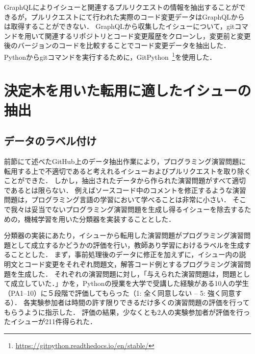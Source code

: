 GraphQLによりイシューと関連するプルリクエストの情報を抽出することができるが，プルリクエストにて行われた実際のコード変更データはGraphQLからは取得することができない．
GraphQLから収集したイシューについて，gitコマンドを用いて関連するリポジトリとコード変更履歴をクローンし，変更前と変更後のバージョンのコードを比較することでコード変更データを抽出した．
Pythonからgitコマンドを実行するために，GitPython~\footnote{\url{https://gitpython.readthedocs.io/en/stable/}}を使用した．

  
\section{決定木を用いた転用に適したイシューの抽出}

\subsection{データのラベル付け}
前節にて述べたGitHub上のデータ抽出作業により，プログラミング演習問題に転用する上で不適切であると考えれるイシューおよびプルリクエストを取り除くことができた．
しかし，抽出されたデータから作られた演習問題がすべて適切であるとは限らない．
例えばソースコード中のコメントを修正するような演習問題は，プログラミング言語の学習において学べることは非常に小さい．
そこで我々は妥当でないプログラミング演習問題を生成し得るイシューを除去するための，機械学習を用いた分類器を実装することとした．


分類器の実装にあたり，イシューから転用した演習問題がプログラミング演習問題として成立するかどうかの評価を行い，教師あり学習におけるラベルを生成することとした．
まず，事前処理後のデータに修正を加えずに，イシュー内の説明文とコード変更をそれぞれ問題文，解答コード例とするプログラミング演習問題を生成した．
それぞれの演習問題に対し，「与えられた演習問題は，問題として成立していた．」かを，Pythonの授業を大学で受講した経験がある10人の学生（PA1--10）に５段階で評価してもらった（1: 全く同意しない -- 5: 強く同意する）．
各実験参加者は時間の許す限りできるだけ多くの演習問題の評価を行ってもらうように指示した．
評価の結果，少なくとも2人の実験参加者が評価を行ったイシューが211件得られた．

